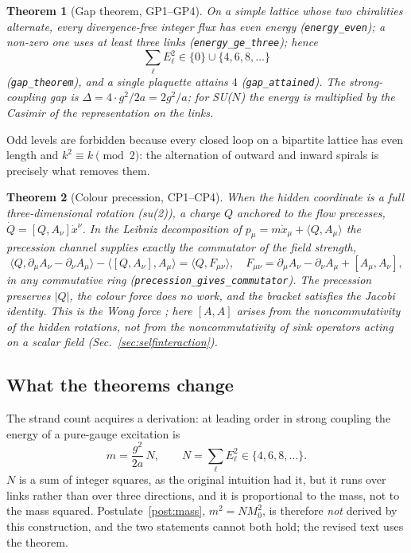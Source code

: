 \documentclass[aps,prd,preprint,superscriptaddress,amsmath,amssymb]{revtex4-2}
\newtheorem{theorem}{Theorem}[section]
\begin{document}
\begin{theorem}[Gap theorem, GP1--GP4]
On a simple lattice whose two chiralities alternate, every divergence-free
integer flux has even energy (\texttt{energy\_even}); a non-zero one uses at
least three links (\texttt{energy\_ge\_three}); hence
\begin{equation}
\sum_\ell E_\ell^2\in\{0\}\cup\{4,6,8,\dots\}
\end{equation}
(\texttt{gap\_theorem}), and a single plaquette attains $4$
(\texttt{gap\_attained}).  The strong-coupling gap is
$\Delta=4\cdot g^2/2a=2g^2/a$; for SU($N$) the energy is multiplied by the
Casimir of the representation on the links.
\end{theorem}

Odd levels are forbidden because every closed loop on a bipartite lattice has
even length and $k^2\equiv k \pmod 2$: the alternation of outward and inward
spirals is precisely what removes them.

\begin{theorem}[Colour precession, CP1--CP4]
When the hidden coordinate is a full three-dimensional rotation (su(2)), a
charge $Q$ anchored to the flow precesses, $\dot Q=[Q,A_\nu]\dot x^\nu$.  In
the Leibniz decomposition of $p_\mu=m\dot x_\mu+\langle Q,A_\mu\rangle$ the
precession channel supplies exactly the commutator of the field strength,
\begin{equation}
\langle Q,\partial_\mu A_\nu-\partial_\nu A_\mu\rangle-\langle[Q,A_\nu],A_\mu\rangle
=\langle Q,F_{\mu\nu}\rangle,\quad
F_{\mu\nu}=\partial_\mu A_\nu-\partial_\nu A_\mu+[A_\mu,A_\nu],
\end{equation}
in any commutative ring (\texttt{precession\_gives\_commutator}).  The
precession preserves $|Q|$, the colour force does no work, and the bracket
satisfies the Jacobi identity.  This is the Wong force \cite{wong1970field};
here $[A,A]$ arises from the noncommutativity of the hidden rotations, not
from the noncommutativity of sink operators acting on a scalar field
(Sec.~\ref{sec:selfinteraction}).
\end{theorem}

\subsection{What the theorems change}

The strand count acquires a derivation: at leading order in strong coupling
the energy of a pure-gauge excitation is
\begin{equation}
m=\frac{g^2}{2a}\,N,\qquad N=\sum_\ell E_\ell^2\in\{4,6,8,\dots\}.
\end{equation}
$N$ is a sum of integer squares, as the original intuition had it, but it runs
over links rather than over three directions, and it is proportional to the
mass, not to the mass squared.  Postulate~\ref{post:mass},
$m^2=NM_0^2$, is therefore \emph{not} derived by this construction, and the two
statements cannot both hold; the revised text uses the theorem.
\end{document}
